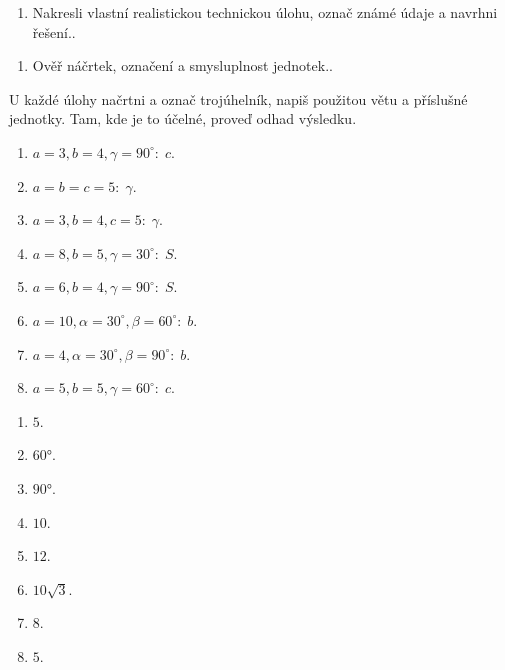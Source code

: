 \documentclass[11pt,a4paper]{article}
\begin{document}
\begin{zadaniReseniBox}[title={Rozšíření 1}]
\begin{enumerate}[label=\alph*)]
\item Nakresli vlastní realistickou technickou úlohu, označ známé údaje a navrhni řešení..
\end{enumerate}
\tcblower
\begin{enumerate}[label=\alph*)]
\item Ověř náčrtek, označení a smysluplnost jednotek..
\end{enumerate}
\end{zadaniReseniBox}
U každé úlohy načrtni a označ trojúhelník, napiš použitou větu a příslušné jednotky. Tam, kde je to účelné, proveď odhad výsledku.
\begin{zadaniReseniBox}[title={Domácí úkol}]
\begin{enumerate}[label=\alph*)]
\item $a=3,b=4,\gamma=90^\circ:\;c$.
\item $a=b=c=5:\;\gamma$.
\item $a=3,b=4,c=5:\;\gamma$.
\item $a=8,b=5,\gamma=30^\circ:\;S$.
\item $a=6,b=4,\gamma=90^\circ:\;S$.
\item $a=10,\alpha=30^\circ,\beta=60^\circ:\;b$.
\item $a=4,\alpha=30^\circ,\beta=90^\circ:\;b$.
\item $a=5,b=5,\gamma=60^\circ:\;c$.
\end{enumerate}
\tcblower
\begin{enumerate}[label=\alph*)]
\item $5$.
\item $60°$.
\item $90°$.
\item $10$.
\item $12$.
\item $10\sqrt3$.
\item $8$.
\item $5$.
\end{enumerate}
\end{zadaniReseniBox}
\end{document}
